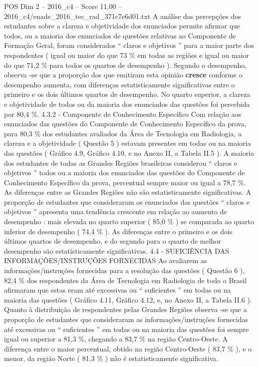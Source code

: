 \begin{textsample}{POS Dim 2 – 2016\_c4 – Score 11.00 – 2016\_c4/enade\_2016\_tec\_rad\_371c7e6d01.txt}
A análise das percepções dos estudantes sobre a clareza e objetividade dos enunciados permite afirmar que todos, ou a maioria dos enunciados de questões relativas ao Componente de Formação Geral, foram considerados “ claros e objetivos ” para a maior parte dos respondentes ( igual ou maior do que 73 \% em todas as regiões e igual ou maior do que 71,2 \% para todos os quartos de desempenho ).
Segundo o desempenho, observa -se que a proporção dos que emitiram esta opinião \textbf{cresce} conforme o desempenho aumenta, com diferenças estatisticamente significativas entre o primeiro e os dois últimos quartos de desempenho.
No quarto superior, a clareza e objetividade de todos ou da maioria dos enunciados das questões foi percebida por 80,4 \%. 4.3.2 - Componente de Conhecimento Específico Com relação aos enunciados das questões do Componente de Conhecimento Específico da prova, para 80,3 \% dos estudantes avaliados da Área de Tecnologia em Radiologia, a clareza e a objetividade ( Questão 5 ) estavam presentes em todas ou na maioria das questões ( Gráfico 4.9, Gráfico 4.10, e no Anexo II, a Tabela II.5 ).
A maioria dos estudantes de todas as Grandes Regiões brasileiras considerou “ claros e objetivos ” todos ou a maioria dos enunciados das questões do Componente de Conhecimento Específico da prova, percentual sempre maior ou igual a 78,7 \%.
As diferenças entre as Grandes Regiões não são estatisticamente significativas.
A proporção de estudantes que consideraram os enunciados das questões “ claros e objetivos ” apresenta uma tendência crescente em relação ao aumento de desempenho : mais elevada no quarto superior ( 85,0 \% ) se comparada ao quarto inferior de desempenho ( 74,4 \% ).
As diferenças entre o primeiro e os dois últimos quartos de desempenho, e do segundo para o quarto de melhor desempenho são estatisticamente significativas. 4.4 - SUFICIÊNCIA DAS INFORMAÇÕES/INSTRUÇÕES FORNECIDAS Ao avaliarem as informações/instruções fornecidas para a resolução das questões ( Questão 6 ), 82,4 \% dos respondentes da Área de Tecnologia em Radiologia de todo o Brasil afirmaram que estas eram até excessivas ou “ suficientes ” em todas ou na maioria das questões ( Gráfico 4.11, Gráfico 4.12, e, no Anexo II, a Tabela II.6 ).
Quanto à distribuição de respondentes pelas Grandes Regiões observa -se que a proporção de estudantes que consideraram as informações/instruções fornecidas até excessivas ou “ suficientes ” em todas ou na maioria das questões foi sempre igual ou superior a 81,3 \%, chegando a 83,7 \% na região Centro-Oeste.
A diferença entre o maior percentual, obtido na região Centro-Oeste ( 83,7 \% ), e o menor, da região Norte ( 81,3 \% ) não é estatisticamente significativa.

\end{textsample}
